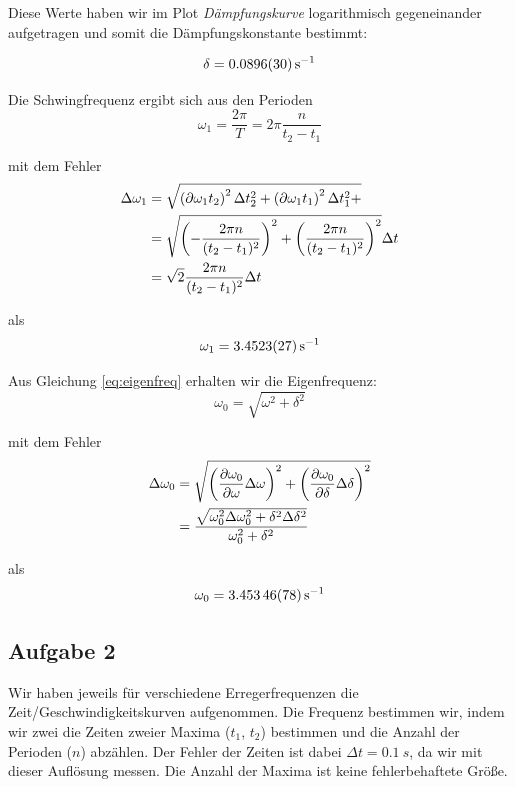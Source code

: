 \documentclass[a4paper,german,12pt,smallheadings]{scrartcl}
\begin{document}
\vspace{1cm}

Diese Werte haben wir im Plot \textit{Dämpfungskurve} logarithmisch
gegeneinander aufgetragen und somit die Dämpfungskonstante bestimmt:

\begin{equation}
  \delta = \SI{0.0896+-0.0030}{s^{-1}}
\end{equation}

Die Schwingfrequenz ergibt sich aus den Perioden
\begin{equation}
  \omega_1 = \frac{2 \pi}{T} = 2 \pi \frac{n}{t_2 - t_1}
\end{equation}

mit dem Fehler
\begin{align}
  \Delta \omega_1 &= \sqrt{
    \del{\partial{\omega_1}{t_2}}^2 \Delta t_2^2 +
    \del{\partial{\omega_1}{t_1}}^2 \Delta t_1^2 +
  } \\
  &= \sqrt{
    \del{-\frac{2 \pi n}{(t_2 - t_1)^2}}^2 +
    \del{\frac{2 \pi n}{(t_2 - t_1)^2}}^2
  } \Delta t \\
  &= \sqrt{2} \frac{2 \pi n}{(t_2 - t_1)^2} \Delta t
\end{align}

als
\begin{equation}
  \omega_1 = \SI{3.4523+-0.0027}{s^{-1}}
\end{equation}

Aus Gleichung \ref{eq:eigenfreq} erhalten wir die Eigenfrequenz:
\begin{equation}
  \omega_0 = \sqrt{\omega^2  + \delta^2}
\end{equation}

mit dem Fehler
\begin{align}
  \Delta \omega_0 &= \sqrt{
  \del{\frac{\partial \omega_0}{\partial \omega} \Delta \omega}^2+
  \del{\frac{\partial \omega_0}{\partial \delta} \Delta \delta}^2
} \\
&= \frac{\sqrt{\omega_0^2 \Delta \omega_0^2 + \delta^2 \Delta \delta^2}}{\omega_0^2 + \delta^2}
\end{align}

als
\begin{equation}
  \omega_0 = \SI{3.45346+-0.00078}{s^{-1}}
\end{equation}


\subsection{Aufgabe 2}
Wir haben jeweils für verschiedene Erregerfrequenzen die
Zeit/Geschwindigkeitskurven aufgenommen. Die Frequenz bestimmen wir, indem wir
zwei die Zeiten zweier Maxima ($t_1$, $t_2$) bestimmen und die Anzahl der
Perioden ($n$) abzählen. Der Fehler der Zeiten ist dabei $\Delta t =
\SI{0.1}{s}$, da wir mit dieser Auflösung messen. Die Anzahl der Maxima ist
keine fehlerbehaftete Größe.
\end{document}
